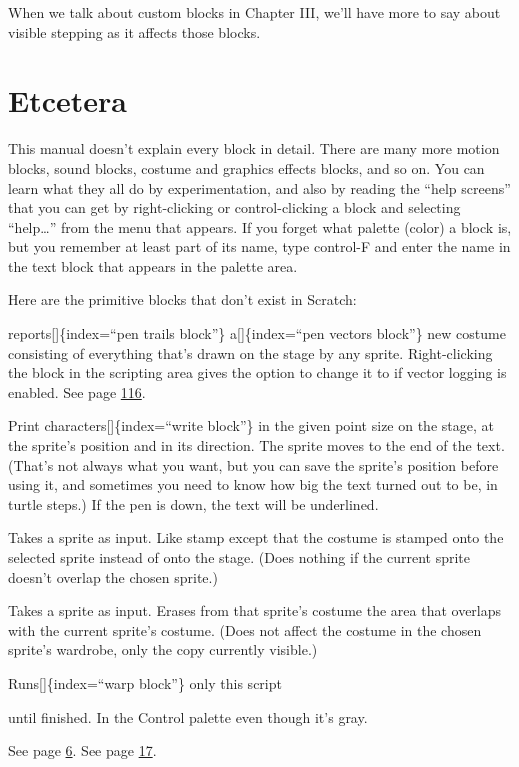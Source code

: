 \documentclass[
  letterpaper,
]{book}
\begin{document}
When we talk about custom blocks in Chapter III, we'll have more to say
about visible stepping as it affects those blocks.

\section{Etcetera}\label{etcetera}

This manual doesn't explain every block in detail. There are many more
motion blocks, sound blocks, costume and graphics effects blocks, and so
on. You can learn what they all do by experimentation, and also by
reading the ``help screens'' that you can get by right-clicking or
control-clicking a block and selecting ``help\ldots{}'' from the menu
that appears. If you forget what palette (color) a block is, but you
remember at least part of its name, type control-F and enter the name in
the text block that appears in the palette area.

Here are the primitive blocks that don't exist in Scratch:

reports{[}{]}\{index=``pen trails block''\} a{[}{]}\{index=``pen vectors
block''\} new costume consisting of everything that's drawn on the stage
by any sprite. Right-clicking the block in the scripting area gives the
option to change it to if vector logging is enabled. See page
\hyperref[logpenvectors]{116}.

Print characters{[}{]}\{index=``write block''\} in the given point size
on the stage, at the sprite's position and in its direction. The sprite
moves to the end of the text. (That's not always what you want, but you
can save the sprite's position before using it, and sometimes you need
to know how big the text turned out to be, in turtle steps.) If the pen
is down, the text will be underlined.

Takes a sprite as input. Like stamp except that the costume is stamped
onto the selected sprite instead of onto the stage. (Does nothing if the
current sprite doesn't overlap the chosen sprite.)

Takes a sprite as input. Erases from that sprite's costume the area that
overlaps with the current sprite's costume. (Does not affect the costume
in the chosen sprite's wardrobe, only the copy currently visible.)

Runs{[}{]}\{index=``warp block''\} only this script

until finished. In the Control palette even though it's gray.

See page \hyperref[generic_when]{6}. See page \hyperref[pause_all]{17}.
\end{document}
